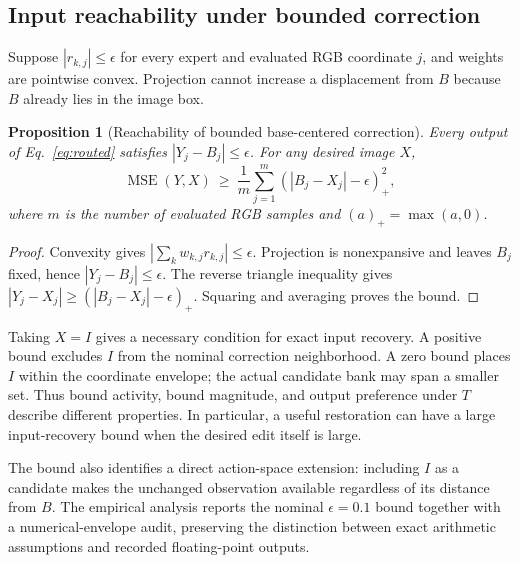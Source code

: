 \documentclass[12pt]{article}
\newcommand{\MSE}{\operatorname{MSE}}
\newtheorem{proposition}{Proposition}
\begin{document}
\subsection{Input reachability under bounded correction}
Suppose $|r_{k,j}|\leq\epsilon$ for every expert and evaluated RGB coordinate $j$, and weights are pointwise convex. Projection cannot increase a displacement from $B$ because $B$ already lies in the image box.
\begin{proposition}[Reachability of bounded base-centered correction]
\label{prop:reachability}
Every output of Eq.~\eqref{eq:routed} satisfies $|Y_j-B_j|\leq\epsilon$. For any desired image $X$,
\begin{equation}
\MSE(Y,X)\ \geq\ \frac{1}{m}\sum_{j=1}^{m}
\left(|B_j-X_j|-\epsilon\right)_+^2, \label{eq:reachable-bound}
\end{equation}
where $m$ is the number of evaluated RGB samples and $(a)_+=\max(a,0)$.
\end{proposition}
\begin{proof}
Convexity gives $|\sum_k w_{k,j}r_{k,j}|\leq\epsilon$. Projection is nonexpansive and leaves $B_j$ fixed, hence $|Y_j-B_j|\leq\epsilon$. The reverse triangle inequality gives $|Y_j-X_j|\geq(|B_j-X_j|-\epsilon)_+$. Squaring and averaging proves the bound.
\end{proof}
Taking $X=I$ gives a necessary condition for exact input recovery. A positive bound excludes $I$ from the nominal correction neighborhood. A zero bound places $I$ within the coordinate envelope; the actual candidate bank may span a smaller set. Thus bound activity, bound magnitude, and output preference under $T$ describe different properties. In particular, a useful restoration can have a large input-recovery bound when the desired edit itself is large.

The bound also identifies a direct action-space extension: including $I$ as a candidate makes the unchanged observation available regardless of its distance from $B$. The empirical analysis reports the nominal $\epsilon=0.1$ bound together with a numerical-envelope audit, preserving the distinction between exact arithmetic assumptions and recorded floating-point outputs.
\end{document}
